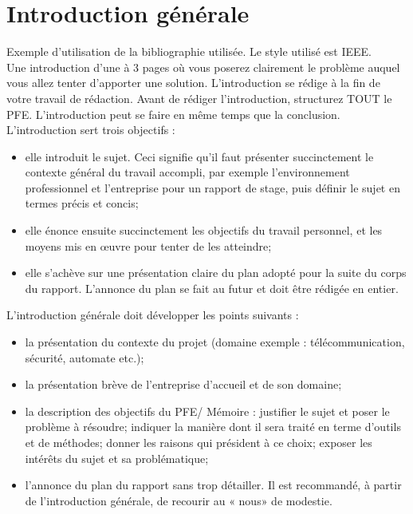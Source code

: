 \chapter*{Introduction générale}

Exemple d'utilisation de la bibliographie utilisée. Le style utilisé est IEEE.\\

Une introduction d’une à 3 pages où vous poserez clairement le problème auquel vous allez tenter d’apporter une solution. L’introduction se rédige à la fin de votre travail de rédaction. Avant de rédiger l’introduction, structurez TOUT le PFE. L’introduction peut se faire en même temps que la conclusion.\\

L’introduction sert trois objectifs :
\begin{itemize}
\item elle introduit le sujet. Ceci signifie qu’il faut présenter succinctement le contexte général du travail accompli, par exemple l’environnement professionnel et l’entreprise pour un rapport de stage, puis définir le sujet en termes précis et concis;
\item elle énonce ensuite succinctement les objectifs du travail personnel, et les moyens mis en œuvre pour tenter de les atteindre;
\item elle s’achève sur une présentation claire du plan adopté pour la suite du corps du rapport. L’annonce du plan se fait au futur et doit être rédigée en entier.
\end{itemize}

\null

L’introduction générale doit développer les points suivants :
\begin{itemize}
\item la présentation du contexte du projet (domaine exemple : télécommunication, sécurité, automate etc.);
\item la présentation brève de l’entreprise d’accueil et de son domaine;
\item la description des objectifs du PFE/ Mémoire : justifier le sujet et poser le problème à résoudre; indiquer  la manière dont il sera traité en terme d’outils et de méthodes; donner les raisons qui président à ce choix; exposer les intérêts du sujet et sa problématique;
\item l’annonce du plan du rapport sans trop détailler.  Il est recommandé, à partir de l’introduction générale, de recourir au « nous» de modestie.
\end{itemize}